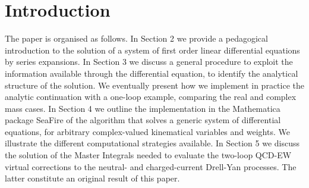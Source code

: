 \section{Introduction}
\label{sec:intro}
The paper is organised as follows.
In Section 2 we provide a pedagogical introduction to the solution
of a system of first order linear differential equations by series expansions.
In Section 3 we discuss a general procedure
to exploit the information available through the differential equation,
to identify the analytical structure of the solution.
We eventually present how we implement in practice the analytic continuation
with a one-loop example, comparing the real and complex mass cases.
In Section 4 we outline the implementation
in the \textsf{Mathematica} package \textsf{SeaFire}
of the algorithm that solves a generic system of differential equations,
for arbitrary complex-valued kinematical variables and weights.
We illustrate the different computational strategies available.
In Section 5 we discuss the solution of the Master Integrals needed to
evaluate the two-loop QCD-EW virtual corrections to the neutral-
and charged-current Drell-Yan processes.
The latter constitute an original result of this paper.
